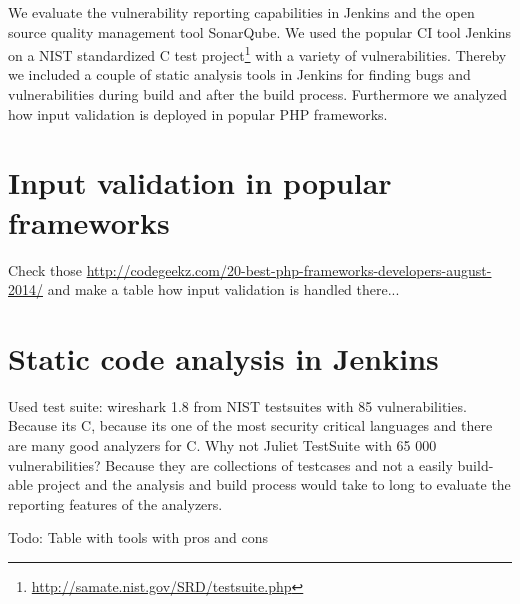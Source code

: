 \documentclass[conference]{IEEEtran}
\begin{document}
We evaluate the vulnerability reporting capabilities in Jenkins and the open source quality management tool SonarQube.
We used the popular CI tool Jenkins on a NIST standardized C test project\footnote{\url{http://samate.nist.gov/SRD/testsuite.php}} with a variety of vulnerabilities.
Thereby we included a couple of static analysis tools in Jenkins for finding bugs and vulnerabilities during build and after the build process.
Furthermore we analyzed how input validation is deployed in popular PHP frameworks.

\section{Input validation in popular frameworks}
\label{sec:input_validation}
Check those \url{http://codegeekz.com/20-best-php-frameworks-developers-august-2014/} and make a table how input validation is handled there...


\section{Static code analysis in Jenkins}
\label{sec:static_code_analysis_jenkins}
Used test suite: wireshark 1.8 from NIST testsuites with 85 vulnerabilities.
Because its C, because its one of the most security critical languages and there are many good analyzers for C.
Why not Juliet TestSuite with 65 000 vulnerabilities?
Because they are collections of testcases and not a easily build-able project and the analysis and build process would take to long to evaluate the reporting features of the analyzers.


Todo: Table with tools with pros and cons
\end{document}

